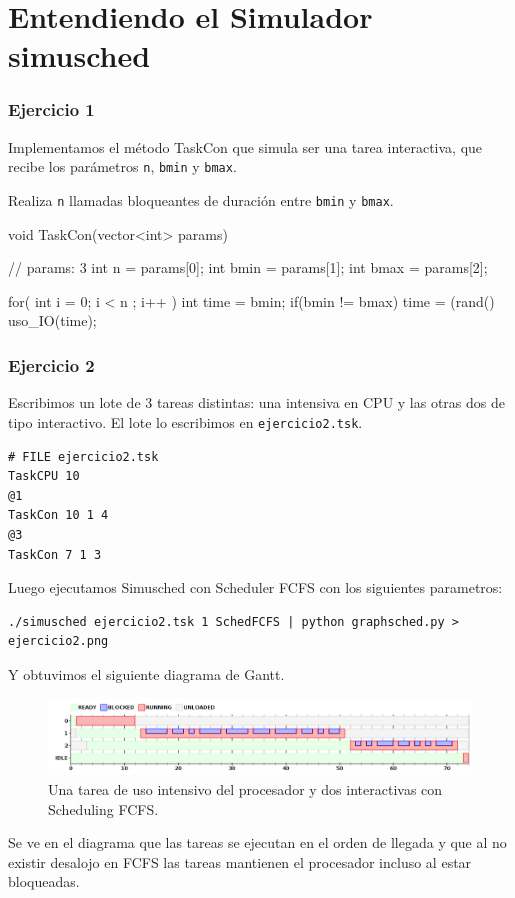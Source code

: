 


\part{Entendiendo el Simulador simusched}

\section{Ejercicio 1}

Implementamos el m\'etodo TaskCon que simula ser una tarea interactiva, que recibe los par\'ametros \verb|n|, \verb|bmin| y \verb|bmax|.

Realiza \verb|n| llamadas bloqueantes de duraci\'on entre \verb|bmin| y \verb|bmax|.

\begin{framed}
\begin{verbatimtab}
void TaskCon(vector<int> params) { // params: 3
	int n = params[0];
	int bmin = params[1];
	int bmax = params[2];
	
	for( int i = 0; i < n ; i++ ) {
		int time = bmin;
		if(bmin != bmax)
			time = (rand()%
		uso_IO(time);
	}
}
\end{verbatimtab}
\end{framed}

\section{Ejercicio 2}

Escribimos un lote de 3 tareas distintas: una intensiva en CPU y las otras dos de tipo interactivo. 
El lote lo escribimos en \verb|ejercicio2.tsk|.

\begin{framed}
\begin{verbatim}
# FILE ejercicio2.tsk
TaskCPU 10
@1
TaskCon 10 1 4
@3
TaskCon 7 1 3
\end{verbatim}
\end{framed}

Luego ejecutamos Simusched con Scheduler FCFS con los siguientes parametros:

\begin{verbatim}
./simusched ejercicio2.tsk 1 SchedFCFS | python graphsched.py > ejercicio2.png
\end{verbatim}

Y obtuvimos el siguiente diagrama de Gantt.

\begin{figure}[H]
  \caption{Una tarea de uso intensivo del procesador y dos interactivas con Scheduling FCFS.}
  \centering
    \includegraphics[width=1\textwidth]{img/ejercicio2.png}
\end{figure}

Se ve en el diagrama que las tareas se ejecutan en el orden de llegada y que al no existir desalojo en FCFS las tareas mantienen el procesador incluso al estar bloqueadas.

